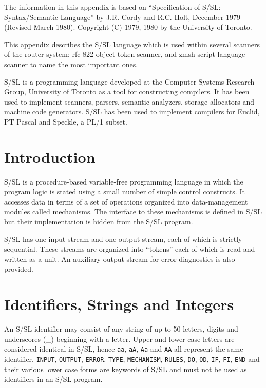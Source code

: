 
The information in this appendix is based on 
``Specification of S/SL: Syntax/Semantic Language'' by 
J.R. Cordy and R.C. Holt, December 1979 (Revised March 1980).
Copyright (C) 1979, 1980 by the  University of  Toronto.

This appendix describes the S/SL language which is used
within several scanners of the router system; rfc-822
object token scanner, and zmsh script language scanner
to name the most important ones.

S/SL is a programming language developed at
the Computer Systems Research Group,
University of Toronto as a tool for constructing compilers.
It has been used to implement scanners, parsers, semantic
analyzers, storage allocators and machine code generators.
S/SL  has  been  used  to implement compilers for Euclid, PT
Pascal and Speckle, a PL/1 subset.


\section{Introduction}

S/SL is a procedure-based variable-free programming 
language in which the program logic is  stated  using  a  small
number  of  simple  control constructs.  It accesses data in
terms of a set of operations organized into  data-management
modules  called  mechanisms.   The interface to these 
mechanisms is defined in S/SL but their implementation is  hidden
from the S/SL program.

S/SL has one input stream and one output stream, each of
which is strictly sequential.  These streams  are  organized
into ``tokens'' each of which is read and written as a unit.
An auxiliary output stream for  error  diagnostics  is  also
provided.




\section{Identifiers, Strings and Integers}

An  S/SL identifier may consist of any string of up to 50
letters, digits and underscores (\_) beginning with a letter.
Upper  and  lower  case  letters are considered identical in
S/SL, hence {\tt aa}, {\tt aA}, {\tt Aa} and {\tt AA} 
all represent the same identifier.  {\tt INPUT}, {\tt OUTPUT}, 
{\tt ERROR}, {\tt TYPE}, {\tt MECHANISM}, {\tt RULES}, 
{\tt DO}, {\tt OD}, {\tt IF}, {\tt FI}, {\tt END} 
and their various lower case forms are  keywords
of  S/SL and must not be used as identifiers in an S/SL 
program.

